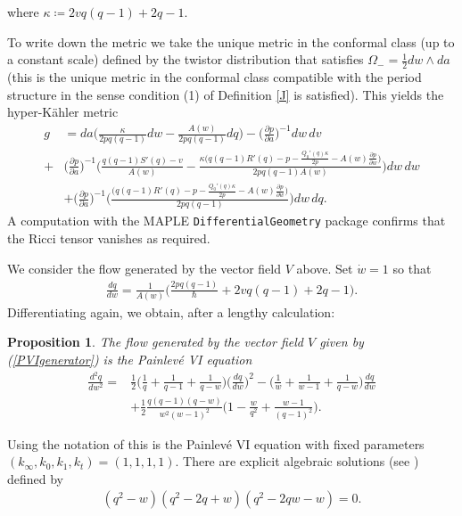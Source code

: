 \documentclass[a4paper,12pt,reqno]{amsart}
\newcounter{counter2}
\numberwithin{equation}{section}
\numberwithin{counter2}{section}
\newcounter{counter3}
\newtheorem{prop}[counter2]{Proposition}
\begin{document}
where $\kappa \coloneqq 2vq(q-1) + 2q - 1$.  \par 
To write down the metric we take the unique metric in the conformal class (up to a constant scale) defined by the twistor distribution that satisfies $\Omega_{-} = \frac{1}{2}dw \wedge da$ (this is the unique metric in the conformal class compatible with the period structure in the sense condition (1) of Definition \ref{J} is satisfied).  This yields the hyper-K\"ahler metric
\begin{align}
g &= da \Bigg( \frac{\kappa}{2pq(q-1)}dw - \frac{A(w)}{2pq(q-1)}dq\Bigg) - \bigg(\frac{\partial p}{\partial a}\bigg)^{-1} dw \,  dv \nonumber  \\ +& \bigg(\frac{\partial p}{\partial a}\bigg)^{-1}\Bigg( \frac{q(q-1)S'(q)-v}{A(w)} - \frac{\kappa\big(q(q-1)R'(q)-p-\frac{Q_0'(q)\kappa}{2p}-A(w)\frac{\partial p}{\partial w}\big)}{2pq(q-1)A(w)}\Bigg)dw\,  dw \nonumber \\ &+ \bigg(\frac{\partial p}{\partial a}\bigg)^{-1} \Bigg(\frac{\big(q(q-1)R'(q)-p-\frac{Q_0'(q)\kappa}{2p} - A(w)\frac{\partial p}{\partial w}\big)}{{2pq(q-1)}} \Bigg)dw \, dq .
\end{align}
A computation with the MAPLE \texttt{DifferentialGeometry} package confirms that the Ricci tensor vanishes as required.  \par 
We consider the flow generated by the vector field $V$ above.  
Set $\dot{w} = 1$ so that
\begin{align}
\frac{dq}{dw} = \frac{1}{A(w)}\Bigg(\frac{2pq(q-1)}{\hbar} + 2vq(q-1) + 2q -1 \Bigg).  
\end{align}
Differentiating again,  we obtain,  after a lengthy calculation: 
\begin{prop}
The flow generated by the vector field $V$ given by \textup{(\ref{PVIgenerator})} is the Painlev\'e VI equation
\begin{align}
\nonumber \frac{d^2q}{dw^2} = &\frac{1}{2}\bigg( \frac{1}{q} + \frac{1}{q-1}+\frac{1}{q-w}\bigg)\bigg(\frac{dq}{dw}\bigg)^2 - \bigg(\frac{1}{w} + \frac{1}{w-1} + \frac{1}{q-w}\bigg)\frac{dq}{dw} \\ &+\frac{1}{2}\frac{q(q-1)(q-w)}{w^2(w-1)^2}\bigg(1-\frac{w}{q^2}+\frac{w-1}{(q-1)^2}\bigg).  
\end{align}
\end{prop}
Using the notation of \cite{F} this is the Painlev\'e VI equation with fixed parameters $(k_\infty,  k_0,  k_1, k_t) = (1,1,1,1)$.  There are explicit algebraic solutions (see \cite {EGH}) defined by 
\begin{align}
(q^2-w)(q^2-2q+w)(q^2-2qw-w) = 0.  
\end{align}
\end{document}
